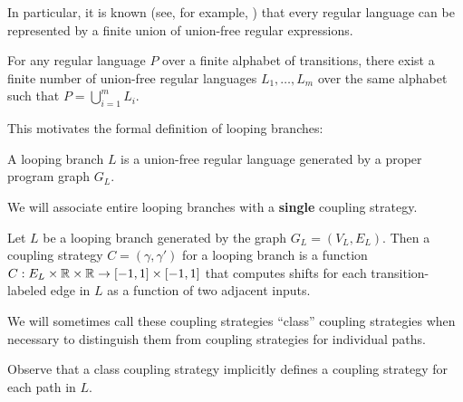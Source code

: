 In particular, it is known (see, for example, \cite{afoninMinimalUnionFreeDecompositions2009}) that every regular language can be represented by a finite union of union-free regular expressions. 

\begin{cor}
    For any regular language $P$ over a finite alphabet of transitions, there exist a finite number of union-free regular languages $L_1,\ldots, L_m$ over the same alphabet such that $P = \bigcup_{i=1}^m L_i$.
\end{cor}

This motivates the formal definition of looping branches:

\begin{defn}
    A looping branch $L$ is a union-free regular language generated by a proper program graph $G_L$.
\end{defn}



We will associate entire looping branches with a \textbf{single} coupling strategy.

\begin{defn}
    Let $L$ be a looping branch generated by the graph $G_L = (V_L, E_L)$. Then a coupling strategy $C = (\gamma, \gamma')$ for a looping branch is a function $C:E_L\times\mathbb{R} \times\mathbb{R}\to [-1, 1]\times[-1, 1]$ that computes shifts for each transition-labeled edge in $L$ as a function of two adjacent inputs.
\end{defn}

We will sometimes call these coupling strategies ``class'' coupling strategies when necessary to distinguish them from coupling strategies for individual paths.

Observe that a class coupling strategy implicitly defines a coupling strategy for each path in $L$.

